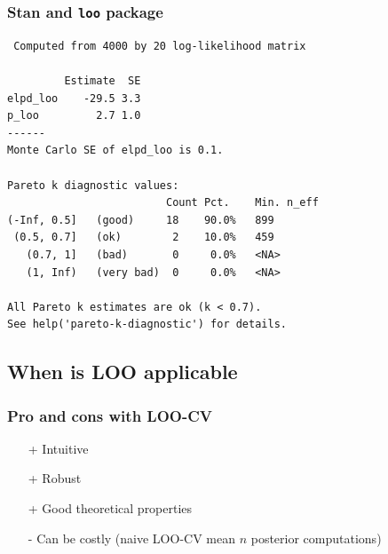 \documentclass[10pt]{beamer}
\begin{document}
\begin{frame}[fragile]

\frametitle{Stan and {\tt loo} package}

  {\scriptsize
\begin{lstlisting}
 Computed from 4000 by 20 log-likelihood matrix

         Estimate  SE
elpd_loo    -29.5 3.3
p_loo         2.7 1.0
------
Monte Carlo SE of elpd_loo is 0.1.

Pareto k diagnostic values:
                         Count Pct.    Min. n_eff
(-Inf, 0.5]   (good)     18    90.0%   899
 (0.5, 0.7]   (ok)        2    10.0%   459
   (0.7, 1]   (bad)       0     0.0%   <NA>
   (1, Inf)   (very bad)  0     0.0%   <NA>

All Pareto k estimates are ok (k < 0.7).
See help('pareto-k-diagnostic') for details.
\end{lstlisting}
}

\end{frame}



\subsection{When is LOO applicable}
\frame{\subsectionpage}

\begin{frame}

\frametitle{Pro and cons with LOO-CV}

  \begin{enumerate}
  \item[+] Intuitive
  \item[+] Robust
  \item[+] Good theoretical properties
  \pause
  \item[-] Can be costly (naive LOO-CV mean $n$ posterior computations)
  \end{enumerate}

\end{frame}
\end{document}
